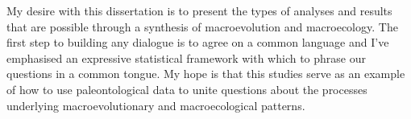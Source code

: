 My desire with this dissertation is to present the types of analyses and results that are possible through a synthesis of macroevolution and macroecology. The first step to building any dialogue is to agree on a common language and I've emphasised an expressive statistical framework with which to phrase our questions in a common tongue. My hope is that this studies serve as an example of how to use paleontological data to unite questions about the processes underlying macroevolutionary and macroecological patterns.
